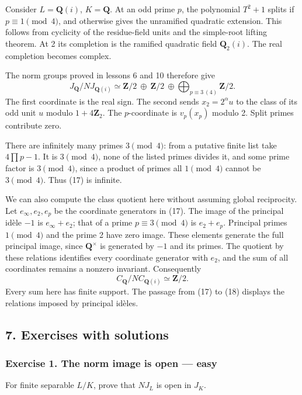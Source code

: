 \documentclass[11pt,a4paper]{article}
\begin{document}
Consider \(L=\mathbf Q(i)\), \(K=\mathbf Q\). At an odd prime \(p\), the
polynomial \(T^2+1\) splits if \(p\equiv1\pmod4\), and otherwise gives
the unramified quadratic extension. This follows from cyclicity of the
residue-field units and the simple-root lifting theorem. At 2 its
completion is the ramified quadratic field \(\mathbf Q_2(i)\). The real
completion becomes complex.

The norm groups proved in lessons 6 and 10 therefore give \[
J_{\mathbf Q}/N J_{\mathbf Q(i)}
\simeq \mathbf Z/2\ \oplus\ \mathbf Z/2\
        \oplus\!\!\bigoplus_{p\equiv3\ (4)}\mathbf Z/2.
\tag{17}
\] The first coordinate is the real sign. The second sends
\(x_2=2^\alpha u\) to the class of its odd unit \(u\) modulo
\(1+4\mathbf Z_2\). The \(p\)-coordinate is \(v_p(x_p)\) modulo 2. Split
primes contribute zero.

There are infinitely many primes \(3\pmod4\): from a putative finite
list take \(4\prod p-1\). It is \(3\pmod4\), none of the listed primes
divides it, and some prime factor is \(3\pmod4\), since a product of
primes all \(1\pmod4\) cannot be \(3\pmod4\). Thus (17) is infinite.

We can also compute the class quotient here without assuming global
reciprocity. Let \(e_\infty,e_2,e_p\) be the coordinate generators in
(17). The image of the principal idèle \(-1\) is \(e_\infty+e_2\); that
of a prime \(p\equiv3\pmod4\) is \(e_2+e_p\). Principal primes
\(1\pmod4\) and the prime 2 have zero image. These elements generate the
full principal image, since \(\mathbf Q^\times\) is generated by \(-1\)
and its primes. The quotient by these relations identifies every
coordinate generator with \(e_2\), and the sum of all coordinates
remains a nonzero invariant. Consequently \[
C_{\mathbf Q}/N C_{\mathbf Q(i)}\simeq\mathbf Z/2.
\tag{18}
\] Every sum here has finite support. The passage from (17) to (18)
displays the relations imposed by principal idèles.

\subsection{7. Exercises with solutions}\label{exercises-with-solutions}

\subsubsection{Exercise 1. The norm image is open ---
easy}\label{exercise-1.-the-norm-image-is-open-easy}

For finite separable \(L/K\), prove that \(N J_L\) is open in \(J_K\).
\end{document}
